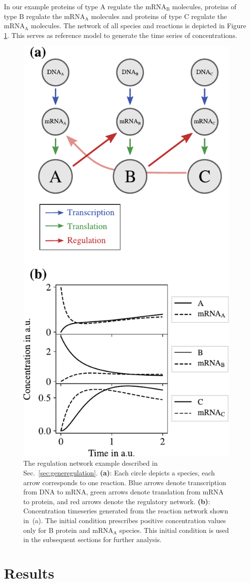 \documentclass[oneside, abstracton, titlepage]{scrartcl}
\begin{document}
    In our example proteins of type $\mathrm{A}$ regulate the $\mathrm{mRNA}_\mathrm{B}$ molecules, proteins of type $\mathrm{B}$ regulate the $\mathrm{mRNA}_\mathrm{A}$ molecules and proteins of type $\mathrm{C}$ regulate the $\mathrm{mRNA}_\mathrm{A}$ molecules. The network of all species and reactions is depicted in Figure \ref{fig:network}. This serves as reference model to generate the time series of concentrations.
    \begin{figure}
        \centering
        \includegraphics[width=.5\textwidth]{./figures_tex/scheme.pdf}
        \caption{The regulation network example described in Sec.~\ref{sec:generegulation}. \textbf{(a)}: Each circle depicts a species, each arrow corresponds to one reaction. Blue arrows denote transcription from DNA to $\mathrm{mRNA}$, green arrows denote translation from $\mathrm{mRNA}$ to protein, and red arrows denote the regulatory network. \textbf{(b)}: Concentration timeseries generated from the reaction network shown in~(a). The initial condition prescribes positive concentration values only for $\mathrm{B}$ protein and $\mathrm{mRNA}_\mathrm{A}$ species. This initial condition is used in the subsequent sections for further analysis.}
        \label{fig:network}
    \end{figure}

	\section{Results} \label{sec:results}
	
\end{document}
